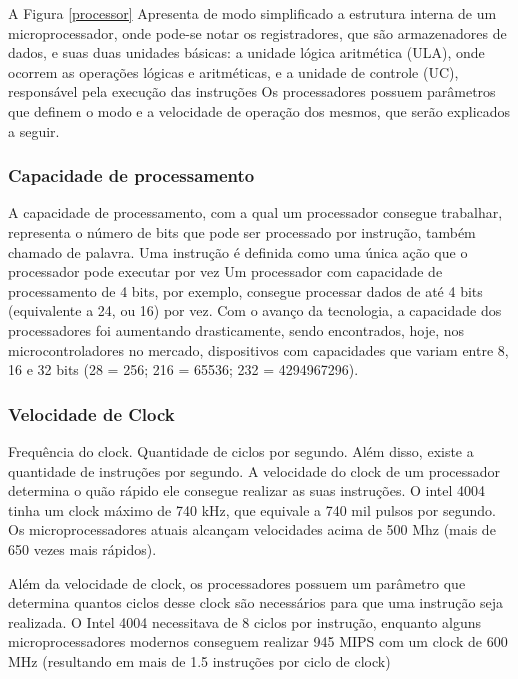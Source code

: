 A Figura \ref{processor} Apresenta de modo simplificado a estrutura interna de um microprocessador, onde pode-se notar os registradores, que são armazenadores de dados, e suas duas unidades básicas: a unidade lógica aritmética (ULA), onde ocorrem as operações lógicas e aritméticas, e a unidade de controle (UC), responsável pela execução das instruções %
Os processadores possuem parâmetros que definem o modo e a velocidade de operação dos mesmos, que serão explicados a seguir.

\subsubsection{Capacidade de processamento}

A capacidade de processamento, com a qual um processador consegue trabalhar, representa o número de bits que pode ser processado por instrução, também chamado de palavra. Uma instrução é definida como uma única ação que o processador pode executar por vez %
Um processador com capacidade de processamento de 4 bits, por exemplo, consegue processar dados de até 4 bits (equivalente a 24, ou 16) por vez. Com o avanço da tecnologia, a capacidade dos processadores foi aumentando drasticamente, sendo encontrados, hoje, nos microcontroladores no mercado, dispositivos com capacidades que variam entre 8, 16 e 32 bits (28 = 256; 216 = 65536; 232 = 4294967296).

\subsubsection{Velocidade de Clock}

Frequência do clock. Quantidade de ciclos por segundo. Além disso, existe a quantidade de instruções por segundo. A velocidade do clock de um processador determina o quão rápido ele consegue realizar as suas instruções. O intel 4004 tinha um clock máximo de 740 kHz, que equivale a 740 mil pulsos por segundo. Os microprocessadores atuais alcançam velocidades acima de 500 Mhz (mais de 650 vezes mais rápidos). 

Além da velocidade de clock, os processadores possuem um parâmetro que determina quantos ciclos desse clock são necessários para que uma instrução seja realizada. O Intel 4004 necessitava de 8 ciclos por instrução, enquanto alguns microprocessadores modernos conseguem realizar 945 MIPS com um clock de 600 MHz (resultando em mais de 1.5 instruções por ciclo de clock) %

